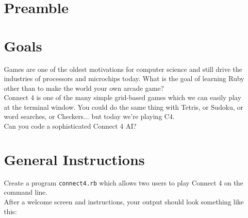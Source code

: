 \documentclass{42-en}
\begin{document}
\chapter{Preamble}


\startexercices



\chapter{Goals}

Games are one of the oldest motivations for computer science and still drive the industries of processors and microchips today. What is the goal of learning Ruby other than to make the world your own arcade game? \\

Connect 4 is one of the many simple grid-based games which we can easily play at the terminal window. You could do the same thing with Tetris, or Sudoku, or word searches, or Checkers... but today we're playing C4. \\

Can you code a sophisticated Connect 4 AI?



\chapter{General Instructions}

Create a program \texttt{connect4.rb} which allows two users to play Connect 4 on the command line. \\

After a welcome screen and instructions, your output should look something like this:
\end{document}

